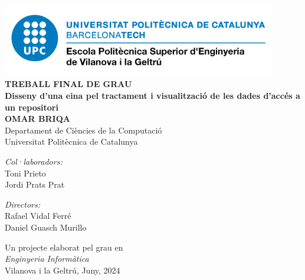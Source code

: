 \begin{titlepage}
    \begin{center}

        \vspace*{-3cm}
        \includegraphics[width=0.9\textwidth]{fig/epsevg-logo} \\ [1cm]

        \huge
        \textbf{TREBALL FINAL DE GRAU} \\ [1cm]

        \huge
        \textbf{Disseny d'una eina pel tractament i visualització de les dades d'accés a un repositori} \\ [1.5cm]

        \LARGE
        \textbf{OMAR BRIQA} \\ [1.5cm]

        \Large
        Departament de Ciències de la Computació \\
        Universitat Politècnica de Catalunya \\ [1cm]

        \begin{minipage}[t]{0.48\textwidth}
            \begin{center}
                \large
                \textit{Col·laboradors:} \\ [0.2cm]
                \Large
                Toni Prieto \\
                Jordi Prats Prat
            \end{center}
        \end{minipage}
        \hfill
        \begin{minipage}[t]{0.48\textwidth}
            \begin{center}
                \large
                \textit{Directors:} \\ [0.2cm]
                \Large
                Rafael Vidal Ferré \\
                Daniel Guasch Murillo
            \end{center}
        \end{minipage}

        \vspace{1.5cm}

        \large
        Un projecte elaborat pel grau en \\ [0.2cm]
        \textit{Enginyeria Informàtica} \\ [0.4cm]
        Vilanova i la Geltrú, Juny, 2024

    \end{center}
\end{titlepage}

